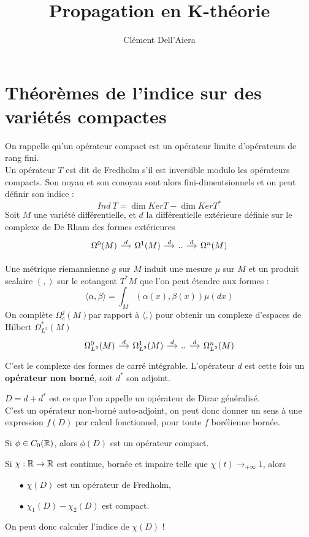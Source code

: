 \documentclass{beamer}
\title{Propagation en K-théorie}
\author{Clément Dell'Aiera}\institute{Université de Lorraine}
\begin{document}
\begin{frame}
\titlepage
\end{frame}

\section{Théorèmes de l'indice sur des variétés compactes}

\begin{frame}
On rappelle qu'un opérateur compact est un opérateur limite d'opérateurs de rang fini. \\
Un opérateur $T$ est dit de Fredholm s'il est inversible modulo les opérateurs compacts. Son noyau et son conoyau sont alors fini-dimentsionnels et on peut définir son indice :
\[Ind\ T = \dim Ker T-\dim Ker T^*\] 
Soit $M$ une variété différentielle, et $d$ la différentielle extérieure définie sur le complexe de De Rham des formes extérieures
\[\begin{tikzcd}[ampersand replacement=\&,column sep = small]
\Omega^0(M) \arrow{r}{d} \& \Omega^1(M) \arrow{r}{d} \& .. \arrow{r}{d} \& \Omega^n(M)  
\end{tikzcd}\]
\end{frame}

\begin{frame}
Une métrique riemannienne $g$ sur $M$ induit une mesure $\mu$ sur $M$ et un produit scalaire $(,)$ sur le cotangent $T^* M$ que l'on peut étendre aux formes :
\[\langle \alpha,\beta\rangle = \int_M (\alpha(x),\beta(x))\mu(dx)\]
On complète $\Omega^j_c(M)$par rapport à $\langle,\rangle$ pour obtenir un complexe d'espaces de Hilbert $\Omega^*_{L^2}(M)$
\[\begin{tikzcd}[ampersand replacement=\&,column sep = small]
\Omega_{L^2}^0(M) \arrow{r}{d} \& \Omega_{L^2}^1(M) \arrow{r}{d} \& .. \arrow{r}{d} \& \Omega_{L^2}^n(M)  
\end{tikzcd}\]
C'est le complexe des formes de carré intégrable. L'opérateur $d$ est cette fois un \textbf{opérateur non borné}, soit $d^*$ son adjoint.
\end{frame}

\begin{frame}
$D= d+d^*$ est ce que l'on appelle un opérateur de Dirac généralisé. \\
C'est un opérateur non-borné auto-adjoint, on peut donc donner un sens à une expression $f(D)$ par calcul fonctionnel, pour toute $f$ borélienne bornée.\\
\begin{thm}
Si $\phi\in C_0(\mathbb R)$, alors $\phi(D)$ est un opérateur compact.
\end{thm}

Si $\chi : \mathbb R\rightarrow \mathbb R$ est continue, bornée et impaire telle que $\chi (t)\rightarrow_{+\infty} 1$, alors 
\begin{itemize}
\item[$\bullet$] $\chi(D)$ est un opérateur de Fredholm,
\item[$\bullet$] $\chi_1(D)-\chi_2(D)$ est compact.
\end{itemize}
On peut donc calculer l'indice de $\chi(D)$ !
\end{frame}
\end{document}
